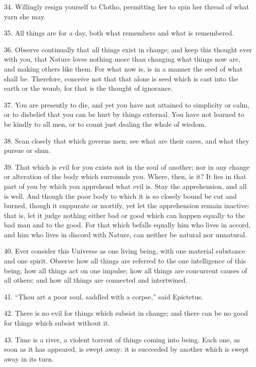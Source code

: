 \documentclass{book}
\begin{document}
34. Willingly resign yourself to Clotho, permitting her to spin her
thread of what yarn she may.

35. All things are for a day, both what remembers and what is
remembered.

36. Observe continually that all things exist in change; and keep this
thought ever with you, that Nature loves nothing more than changing
what things now are, and making others like them. For what now is, is
in a manner the seed of what shall be. Therefore, conceive not that
that alone is seed which is cast into the earth or the womb, for that
is the thought of ignorance.

37. You are presently to die, and yet you have not attained to
simplicity or calm, or to disbelief that you can be hurt by things
external. You have not learned to be kindly to all men, or to count
just dealing the whole of wisdom.

38. Scan closely that which governs men; see what are their cares, and
what they pursue or shun.

39. That which is evil for you exists not in the soul of another; nor
in any change or alteration of the body which surrounds you. Where,
then, is it? It lies in that part of you by which you apprehend what
evil is. Stay the apprehension, and all is well. And though the poor
body to which it is so closely bound be cut and burned, though it
suppurate or mortify, yet let the apprehension remain inactive: that
is, let it judge nothing either bad or good which can happen equally
to the bad man and to the good. For that which befalls equally him who
lives in accord, and him who lives in discord with Nature, can neither
be natural nor unnatural.

40. Ever consider this Universe as one living being, with one material
substance and one spirit. Observe how all things are referred to the
one intelligence of this being; how all things act on one impulse; how
all things are concurrent causes of all others; and how all things are
connected and intertwined.

41. ``Thou art a poor soul, saddled with a corpse,'' said Epictetus.

42. There is no evil for things which subsist in change; and there can
be no good for things which subsist without it.

43. Time is a river, a violent torrent of things coming into
being. Each one, as soon as it has appeared, is swept away: it is
succeeded by another which is swept away in its turn.
\end{document}
